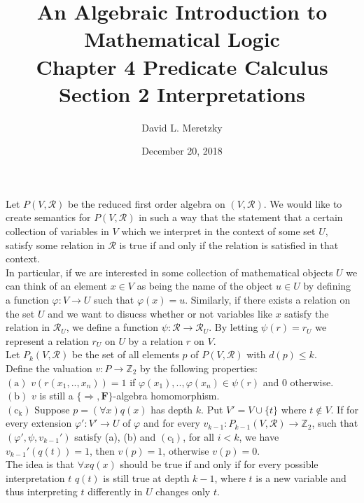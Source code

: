 \documentclass{article}
\title{ \vspace{-10ex} %
An Algebraic Introduction to Mathematical Logic\\
Chapter 4 Predicate Calculus \\
Section 2 Interpretations \\
}
\author{David L. Meretzky
}
\date{%
December 20, 2018
}
\theoremstyle{problemstyle}
\theoremstyle{lemmastyle}
\theoremstyle{theoremstyle}
\theoremstyle{problemstyle}
\begin{document}
\maketitle

Let $P(V,\mathscr{R})$ be the reduced first order algebra on $(V,\mathscr{R})$. We would like to create semantics for $P(V,\mathscr{R})$ in such a way that the statement that a certain collection of variables in $V$ which we interpret in the context of some set $U$, satisfy some relation in $\mathscr{R}$ is true if and only if the relation is satisfied in that context.\\

In particular, if we are interested in some collection of mathematical objects $U$ we can think of an element $x \in V$ as being the name of the object $u \in U$ by defining a function $\varphi:V \rightarrow U$ such that $\varphi(x) = u$. Similarly, if there exists a relation on the set $U$ and we want to disucss whether or not variables like $x$ satisfy the relation in $\mathscr{R}_U$, we define a function $\psi:\mathscr{R} \rightarrow \mathscr{R}_U$. By letting $\psi(r) = r_U$ we represent a relation $r_U$ on $U$ by a relation $r$ on $V$.\\

Let $P_k(V,\mathscr{R})$ be the set of all elements $p$ of $P(V,\mathscr{R})$ with $d(p) \leq k$. \\

Define the valuation $v:P \rightarrow \mathbb{Z}_2$ by the following properties:\\

$(\text{a})$ $v(r(x_1,..,x_n)) = 1$ if $\varphi(x_1),..,\varphi(x_n) \in \psi(r)$ and $0$ otherwise.\\
$(\text{b})$ $v$ is still a $\{\Rightarrow, \textbf{F}\}$-algebra homomorphism.\\
$(\text{c}_\text{k})$ Suppose $p = (\forall x)q(x)$ has depth $k$. Put $V' = V \cup \{t\}$ where $t \notin V$. If for every extension $\varphi':V' \rightarrow U$ of $\varphi$ and for every $v_{k-1}:P_{k-1}(V, \mathscr{R})\rightarrow \mathbb{Z}_2$, such that $(\varphi',\psi,v_{k-1}')$ satisfy (a), (b) and $(\text{c}_\text{i})$, for all $i < k$, we have $v_{k-1}'(q(t))=1$, then $v(p) = 1$, otherwise $v(p) = 0$.\\  

The idea is that $\forall x q(x)$ should be true if and only if for every possible interpretation $t$ $q(t)$ is still true at depth $k-1$, where $t$ is a new variable and thus interpreting $t$ differently in $U$ changes only $t$. 
\end{document}
